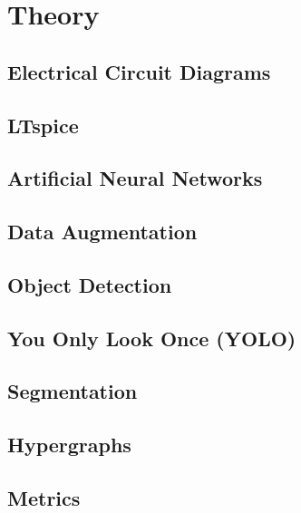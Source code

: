\chapter{Theory}

\section{Electrical Circuit Diagrams}


\section{LTspice}


\section{Artificial Neural Networks}


\section{Data Augmentation}


\section{Object Detection}


\section{You Only Look Once (YOLO)}


\section{Segmentation}


% 


\section{Hypergraphs}


\section{Metrics}

